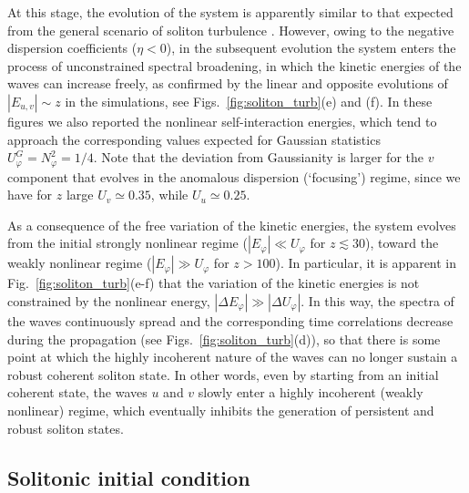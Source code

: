 \documentclass[pra,twocolumn,showpacs,preprintnumbers,amsmath,amssymb]{revtex4}
\def\vfi{\varphi}
\begin{document}
At this stage, the evolution of the system is apparently similar to that expected from the general scenario of soliton turbulence \cite{zakharov88,zakharov89,jordan,rumpf01,rumpf03,ZakhPhysRep01,
nazarenkoPR,nazarenko}.
However, owing to the negative dispersion coefficients ($\eta < 0$), in the subsequent evolution the system enters the process of unconstrained spectral broadening, in which the kinetic energies of the waves can increase freely, as confirmed by the linear and opposite evolutions of $|E_{u,v}| \sim z$ in the simulations, see Figs.~\ref{fig:soliton_turb}(e) and (f).
In these figures we also reported the nonlinear self-interaction energies, which tend to approach the corresponding values expected for Gaussian statistics $U_\vfi^G = N_\vfi^2 =1/4$. Note that the deviation from Gaussianity is larger for the $v$ component that evolves in the anomalous dispersion (`focusing') regime, since we have for $z$ large  $U_v \simeq 0.35$, while $U_u \simeq 0.25$.

As a consequence of the free variation of the kinetic energies, the system evolves from the initial strongly nonlinear regime ($|E_\vfi| \ll U_\vfi$ for $z \lesssim 30$), toward the weakly nonlinear regime ($|E_\vfi| \gg U_\vfi$ for $z>100$).
In particular, it is apparent in Fig.~\ref{fig:soliton_turb}(e-f) that the variation of the kinetic energies is not constrained by the nonlinear energy, $|\Delta E_\vfi| \gg |\Delta U_\vfi|$.
In this way, the spectra of the waves continuously spread and the corresponding time correlations decrease during the propagation (see Figs.~\ref{fig:soliton_turb}(d)), so that there is some point at which the highly incoherent nature of the waves can no longer sustain a robust coherent soliton state.   
In other words, even by starting from an initial coherent state, the waves $u$ and $v$ slowly enter a highly incoherent (weakly nonlinear) regime, which eventually inhibits the generation of persistent and robust soliton states.



\subsection{Solitonic initial condition}
\end{document}
